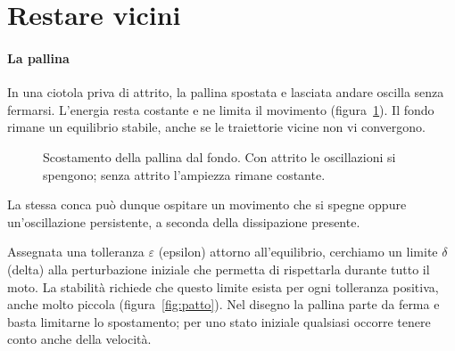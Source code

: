 \documentclass[11pt]{article}
\begin{document}
\section{Restare vicini}\label{sec:vicini}

\paragraph{La pallina} In una ciotola priva di attrito, la pallina spostata e lasciata andare oscilla senza fermarsi. L'energia resta costante e ne limita il movimento (figura~\ref{fig:duegrafici}). Il fondo rimane un equilibrio stabile, anche se le traiettorie vicine non vi convergono.

\begin{figure}[htbp]
\centering
{}
\caption{Scostamento della pallina dal fondo. Con attrito le oscillazioni si spengono; senza attrito l'ampiezza rimane costante.}
\label{fig:duegrafici}
\end{figure}

La stessa conca può dunque ospitare un movimento che si spegne oppure un'oscillazione persistente, a seconda della dissipazione presente.

Assegnata una tolleranza $\varepsilon$ (epsilon) attorno all'equilibrio, cerchiamo un limite $\delta$ (delta) alla perturbazione iniziale che permetta di rispettarla durante tutto il moto. La stabilità richiede che questo limite esista per ogni tolleranza positiva, anche molto piccola (figura~\ref{fig:patto}). Nel disegno la pallina parte da ferma e basta limitarne lo spostamento; per uno stato iniziale qualsiasi occorre tenere conto anche della velocità.
\end{document}
